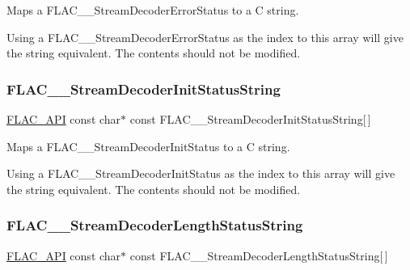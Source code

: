 Maps a F\+L\+A\+C\+\_\+\+\_\+\+Stream\+Decoder\+Error\+Status to a C string.

Using a F\+L\+A\+C\+\_\+\+\_\+\+Stream\+Decoder\+Error\+Status as the index to this array will give the string equivalent. The contents should not be modified. \mbox{\label{group__flac__stream__decoder_ga34953a802ba44d861dcc8e9f2bb9d659}} 
\subsubsection{\texorpdfstring{FLAC\_\_StreamDecoderInitStatusString}{FLAC\_\_StreamDecoderInitStatusString}}
{\footnotesize\ttfamily \mbox{\hyperlink{group__flac__export_ga56ca07df8a23310707732b1c0007d6f5}{F\+L\+A\+C\+\_\+\+A\+PI}} const char$\ast$ const F\+L\+A\+C\+\_\+\+\_\+\+Stream\+Decoder\+Init\+Status\+String\mbox{[}$\,$\mbox{]}}

Maps a F\+L\+A\+C\+\_\+\+\_\+\+Stream\+Decoder\+Init\+Status to a C string.

Using a F\+L\+A\+C\+\_\+\+\_\+\+Stream\+Decoder\+Init\+Status as the index to this array will give the string equivalent. The contents should not be modified. \mbox{\label{group__flac__stream__decoder_ga434d91c0bf414d7c432bc6e761bdd55e}} 
\subsubsection{\texorpdfstring{FLAC\_\_StreamDecoderLengthStatusString}{FLAC\_\_StreamDecoderLengthStatusString}}
{\footnotesize\ttfamily \mbox{\hyperlink{group__flac__export_ga56ca07df8a23310707732b1c0007d6f5}{F\+L\+A\+C\+\_\+\+A\+PI}} const char$\ast$ const F\+L\+A\+C\+\_\+\+\_\+\+Stream\+Decoder\+Length\+Status\+String\mbox{[}$\,$\mbox{]}}

